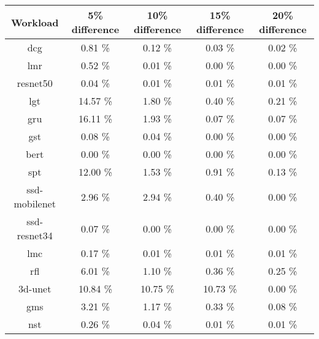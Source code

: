 \begin{tabular}{|c|c|c|c|c|}
\hline
  \textbf{Workload} & \textbf{5\% difference} & \textbf{10\% difference} & \textbf{15\% difference} & \textbf{20\% difference}\\
\hline
\hline
  dcg & 0.81 \% & 0.12 \% & 0.03 \% & 0.02 \%\\
  lmr & 0.52 \% & 0.01 \% & 0.00 \% & 0.00 \%\\
  resnet50 & 0.04 \% & 0.01 \% & 0.01 \% & 0.01 \%\\
  lgt & 14.57 \% & 1.80 \% & 0.40 \% & 0.21 \%\\
  gru & 16.11 \% & 1.93 \% & 0.07 \% & 0.07 \%\\
  gst & 0.08 \% & 0.04 \% & 0.00 \% & 0.00 \%\\
  bert & 0.00 \% & 0.00 \% & 0.00 \% & 0.00 \%\\
  spt & 12.00 \% & 1.53 \% & 0.91 \% & 0.13 \%\\
  ssd-mobilenet & 2.96 \% & 2.94 \% & 0.40 \% & 0.00 \%\\
  ssd-resnet34 & 0.07 \% & 0.00 \% & 0.00 \% & 0.00 \%\\
  lmc & 0.17 \% & 0.01 \% & 0.01 \% & 0.01 \%\\
  rfl & 6.01 \% & 1.10 \% & 0.36 \% & 0.25 \%\\
  3d-unet & 10.84 \% & 10.75 \% & 10.73 \% & 0.00 \%\\
  gms & 3.21 \% & 1.17 \% & 0.33 \% & 0.08 \%\\
  nst & 0.26 \% & 0.04 \% & 0.01 \% & 0.01 \%\\
\hline
\end{tabular}
